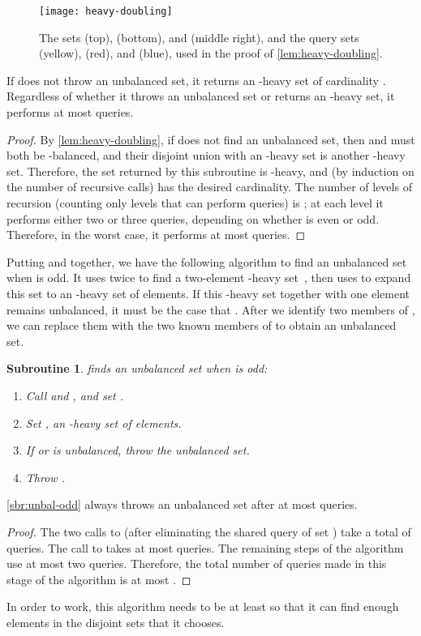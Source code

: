 \documentclass[11pt]{llncs}
\newcommand{\figurescale}{0.5}
\newcommand{\figurescale}{0.45}
\newtheorem{subroutine}{Subroutine}
\begin{document}
\begin{figure}[t]
\centering\texttt{[image: heavy-doubling]}
\caption{The sets  (top),  (bottom), and  (middle right), and the query sets  (yellow),  (red), and  (blue), used in the proof of \autoref{lem:heavy-doubling}.}
\label{fig:heavy-doubling}
\end{figure}

\ifFull
\begin{lemma}
If  does not throw an unbalanced set, it returns an -heavy set of cardinality . Regardless of whether it throws an unbalanced set or returns an -heavy set, it performs at most  queries.
\end{lemma}
\begin{proof}
\fi
By \autoref{lem:heavy-doubling}, if  does not find an unbalanced set, then  and  must both be -balanced, and their disjoint union with an -heavy set is another -heavy set. Therefore, the set returned by this subroutine is -heavy, and
(by induction on the number of recursive calls)
has the desired cardinality. The number of levels of recursion (counting only levels that can perform queries) is ; at each level it performs either two or three queries, depending on whether  is even or odd. Therefore, in the worst case, it performs at most  queries.
\ifFull
\end{proof}
\fi

Putting  and  together, we have the following algorithm to find an unbalanced set when  is odd. It uses  twice to find a two-element -heavy set~, then uses  to expand this set to an -heavy set of  elements.
If this -heavy set together with one element  remains unbalanced, it must be the case that . After we identify two members of , we can replace them with the two known members of  to obtain an unbalanced set.

\begin{subroutine} finds an unbalanced set when  is odd:
\label{sbr:unbal-odd}
\begin{enumerate}
\item Call  and , and set .
\item Set , an -heavy set of  elements.
\item If  or  is unbalanced, throw the unbalanced set.
\item Throw .
\end{enumerate}
\end{subroutine}

\ifFull
\begin{lemma}
\autoref{sbr:unbal-odd} always throws an unbalanced set after at most  queries.
\end{lemma}
\begin{proof}
\fi
The two calls to  (after eliminating the shared query of set ) take a total of  queries. The call to  takes at most  queries. The remaining steps of the algorithm use at most two queries. Therefore, the total number of queries made in this stage of the algorithm is at most .
\ifFull
\end{proof}
\fi
In order to work, this algorithm needs  to be at least  so that it can find enough elements in the disjoint sets that it chooses.
\end{document}
